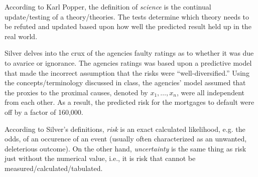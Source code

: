 \documentclass[12pt]{article}
\begin{document}
\begin{enumerate}
\begin{tcolorbox}[colback=white, sharp corners]
\end{tcolorbox}


\begin{tcolorbox}[colback=white, sharp corners]

According to Karl Popper, the definition of \emph{science} is the continual update/testing of a theory/theories. The tests determine which theory needs to be refuted and updated based upon how well the predicted result held up in the real world. 

\end{tcolorbox}


\begin{tcolorbox}[colback=white, sharp corners]

Silver delves into the crux of the agencies faulty ratings as to whether it was due to avarice or ignorance. The agencies ratings was based upon a predictive model that made the incorrect assumption that the risks were ``well-diversified.'' Using the concepts/terminology discussed in class, the agencies' model assumed that the proxies to the proximal causes, denoted by $x_1, \ldots, x_n$, were all independent from each other. As a result, the predicted risk for the mortgages to default were off by a factor of 160,000. 

\end{tcolorbox}


\begin{tcolorbox}[colback=white, sharp corners]

According to Silver's definitions, \emph{risk} is an exact calculated likelihood, e.g. the odds, of an occurence of an event (usually often characterized as an unwanted, deleterious outcome). On the other hand, \emph{uncertainty} is the same thing as risk just without the numerical value, i.e., it is risk that cannot be measured/calculated/tabulated. 


\end{tcolorbox}
\end{enumerate}
\end{document}
